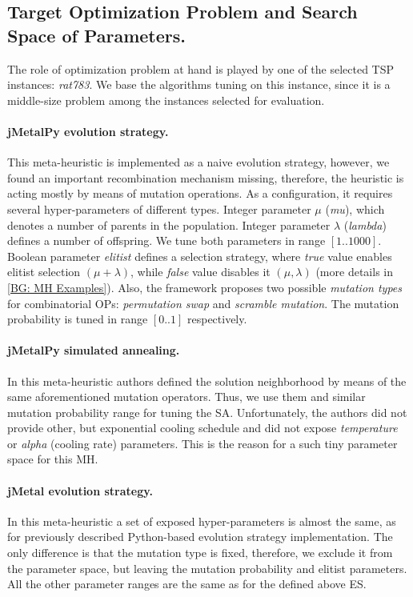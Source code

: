 \subsection{Target Optimization Problem and Search Space of Parameters.} 
The role of optimization problem at hand is played by one of the selected TSP instances: \emph{rat783}. We base the algorithms tuning on this instance, since it is a middle-size problem among the instances selected for evaluation.

\paragraph{jMetalPy evolution strategy.} This meta-heuristic is implemented as a naive evolution strategy, however, we found an important recombination mechanism missing, therefore, the heuristic is acting mostly by means of mutation operations. As a configuration, it requires several hyper-parameters of different types. Integer parameter $\mu$ (\emph{mu}), which denotes a number of parents in the population. Integer parameter $\lambda$ (\emph{lambda}) defines a number of offspring. We tune both parameters in range $[1..1000]$. Boolean parameter \emph{elitist} defines a selection strategy, where \emph{true} value enables elitist selection $(\mu+\lambda)$, while \emph{false} value disables it $(\mu,\lambda)$ (more details in \cref{BG: MH Examples}). Also, the framework proposes two possible \emph{mutation types} for combinatorial OPs: \emph{permutation swap} and \emph{scramble mutation}. The mutation probability is tuned in range $[0..1]$ respectively.

\paragraph{jMetalPy simulated annealing.} In this meta-heuristic authors defined the solution neighborhood by means of the same aforementioned mutation operators. Thus, we use them and similar mutation probability range for tuning the SA. Unfortunately, the authors did not provide other, but exponential cooling schedule and did not expose \emph{temperature} or \emph{alpha} (cooling rate) parameters. This is the reason for a such tiny parameter space for this MH.

\paragraph{jMetal evolution strategy.} In this meta-heuristic a set of exposed hyper-parameters is almost the same, as for previously described Python-based evolution strategy implementation. The only difference is that the mutation type is fixed, therefore, we exclude it from the parameter space, but leaving the mutation probability and elitist parameters. All the other parameter ranges are the same as for the defined above ES.



